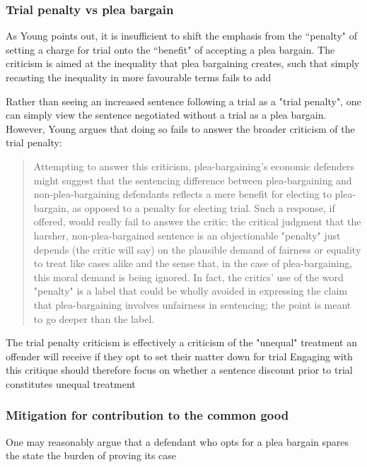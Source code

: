 \subsubsection{Trial penalty vs plea bargain}

As Young points out, it is insufficient to shift the emphasis from the ``penalty" of setting a charge for trial onto the ``benefit" of accepting a plea bargain. The criticism is aimed at the inequality that plea bargaining creates, such that simply recasting the inequality in more favourable terms fails to add

Rather than seeing an increased sentence following a trial as a "trial penalty", one can simply view the sentence negotiated without a trial as a plea bargain. However, Young argues that doing so fails to answer the broader criticism of the trial penalty:

\begin{quote}
    Attempting to answer this criticism, plea-bargaining's economic defenders might suggest that the sentencing difference between plea-bargaining and non-plea-bargaining defendants reflects a mere benefit for electing to plea-bargain, as opposed to a penalty for electing trial. Such a response, if offered, would really fail to answer the critic: the critical judgment that the harsher, non-plea-bargained sentence is an objectionable "penalty" just depends (the critic will say) on the plausible demand of fairness or equality to treat like cases alike and the sense that, in the case of plea-bargaining, this moral demand is being ignored. In fact, the critics' use of the word "penalty" is a label that could be wholly avoided in expressing the claim that plea-bargaining involves unfairness in sentencing; the point is meant to go deeper than the label.
\end{quote}

The trial penalty criticism is effectively a criticism of the "unequal" treatment an offender will receive if they opt to set their matter down for trial
Engaging with this critique should therefore focus on whether a sentence discount prior to trial constitutes unequal treatment

\subsubsection{Mitigation for contribution to the common good}

One may reasonably argue that a defendant who opts for a plea bargain spares the state the burden of proving its case

